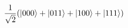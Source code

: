 \documentclass[preview]{standalone}
\begin{document}
\begin{align*}
\frac{1}{\sqrt{2}}(\ket{000} + \ket{011}+\ket{100} +\ket{111})
\end{align*}
\end{document}
